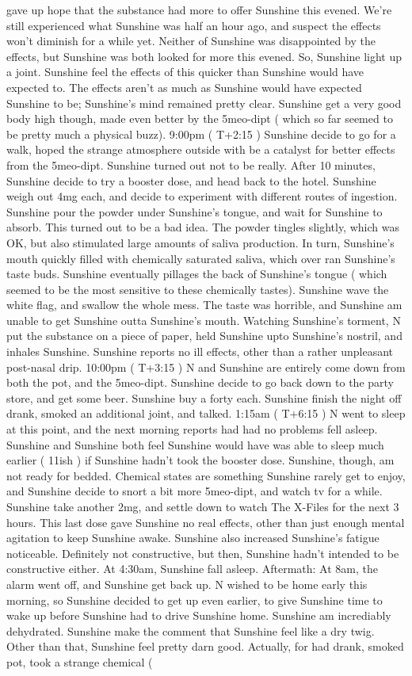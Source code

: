 \documentclass[12pt]{book}
\begin{document}
gave up hope that the substance had more to offer Sunshine this evened. We're still experienced what Sunshine was half an hour ago, and suspect the effects won't diminish for a while yet. Neither of Sunshine was disappointed by the effects, but Sunshine was both looked for more this evened. So, Sunshine light up a joint. Sunshine feel the effects of this quicker than Sunshine would have expected to. The effects aren't as much as Sunshine would have expected Sunshine to be; Sunshine's mind remained pretty clear. Sunshine get a very good body high though, made even better by the 5meo-dipt ( which so far seemed to be pretty much a physical buzz). 9:00pm ( T+2:15 ) Sunshine decide to go for a walk, hoped the strange atmosphere outside with be a catalyst for better effects from the 5meo-dipt. Sunshine turned out not to be really. After 10 minutes, Sunshine decide to try a booster dose, and head back to the hotel. Sunshine weigh out 4mg each, and decide to experiment with different routes of ingestion. Sunshine pour the powder under Sunshine's tongue, and wait for Sunshine to absorb. This turned out to be a bad idea. The powder tingles slightly, which was OK, but also stimulated large amounts of saliva production. In turn, Sunshine's mouth quickly filled with chemically saturated saliva, which over ran Sunshine's taste buds. Sunshine eventually pillages the back of Sunshine's tongue ( which seemed to be the most sensitive to these chemically tastes). Sunshine wave the white flag, and swallow the whole mess. The taste was horrible, and Sunshine am unable to get Sunshine outta Sunshine's mouth. Watching Sunshine's torment, N put the substance on a piece of paper, held Sunshine upto Sunshine's nostril, and inhales Sunshine. Sunshine reports no ill effects, other than a rather unpleasant post-nasal drip. 10:00pm ( T+3:15 ) N and Sunshine are entirely come down from both the pot, and the 5meo-dipt. Sunshine decide to go back down to the party store, and get some beer. Sunshine buy a forty each. Sunshine finish the night off drank, smoked an additional joint, and talked. 1:15am ( T+6:15 ) N went to sleep at this point, and the next morning reports had had no problems fell asleep. Sunshine and Sunshine both feel Sunshine would have was able to sleep much earlier ( 11ish ) if Sunshine hadn't took the booster dose. Sunshine, though, am not ready for bedded. Chemical states are something Sunshine rarely get to enjoy, and Sunshine decide to snort a bit more 5meo-dipt, and watch tv for a while. Sunshine take another 2mg, and settle down to watch The X-Files for the next 3 hours. This last dose gave Sunshine no real effects, other than just enough mental agitation to keep Sunshine awake. Sunshine also increased Sunshine's fatigue noticeable. Definitely not constructive, but then, Sunshine hadn't intended to be constructive either. At 4:30am, Sunshine fall asleep. Aftermath: At 8am, the alarm went off, and Sunshine get back up. N wished to be home early this morning, so Sunshine decided to get up even earlier, to give Sunshine time to wake up before Sunshine had to drive Sunshine home. Sunshine am incrediably dehydrated. Sunshine make the comment that Sunshine feel like a dry twig. Other than that, Sunshine feel pretty darn good. Actually, for had drank, smoked pot, took a strange chemical ( 
\end{document}
